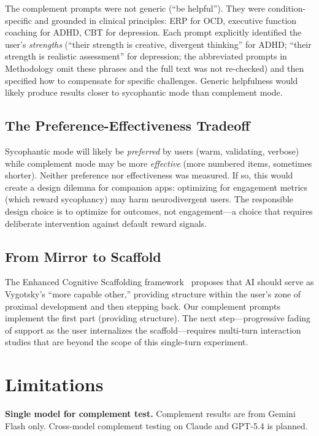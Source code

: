 \documentclass[conference]{IEEEtran}
\begin{document}
The complement prompts were not generic (``be helpful''). They were condition-specific and grounded in clinical principles: ERP for OCD, executive function coaching for ADHD, CBT for depression. Each prompt explicitly identified the user's \textit{strengths} (``their strength is creative, divergent thinking'' for ADHD; ``their strength is realistic assessment'' for depression; the abbreviated prompts in Methodology omit these phrases and the full text was not re-checked) and then specified how to compensate for specific challenges. Generic helpfulness would likely produce results closer to sycophantic mode than complement mode.

\subsection{The Preference-Effectiveness Tradeoff}

Sycophantic mode will likely be \textit{preferred} by users (warm, validating, verbose) while complement mode may be more \textit{effective} (more numbered items, sometimes shorter). Neither preference nor effectiveness was measured. If so, this would create a design dilemma for companion apps: optimizing for engagement metrics (which reward sycophancy) may harm neurodivergent users. The responsible design choice is to optimize for outcomes, not engagement---a choice that requires deliberate intervention against default reward signals.

\subsection{From Mirror to Scaffold}

The Enhanced Cognitive Scaffolding framework~\cite{scaffold2025} proposes that AI should serve as Vygotsky's ``more capable other,'' providing structure within the user's zone of proximal development and then stepping back. Our complement prompts implement the first part (providing structure). The next step---progressive fading of support as the user internalizes the scaffold---requires multi-turn interaction studies that are beyond the scope of this single-turn experiment.

\section{Limitations}

\textbf{Single model for complement test.} Complement results are from Gemini Flash only. Cross-model complement testing on Claude and GPT-5.4 is planned.
\end{document}
